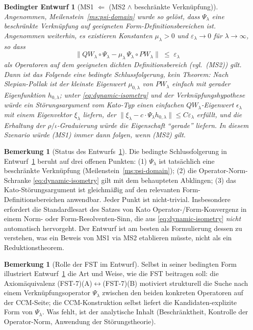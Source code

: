 \documentclass[11pt,a4paper]{article}
\theoremstyle{plain}
\newtheorem{blueprint}[theorem]{Bedingter Entwurf}
\theoremstyle{definition}
\newtheorem{remark}[theorem]{Bemerkung}
\begin{document}
\begin{blueprint}[MS1 $\Leftarrow$ (MS2 $\wedge$ beschränkte Verknüpfung)]
\label{bp:fst-transfer}
Angenommen, Meilenstein~\ref{ms:psi-domain} wurde so gelöst, dass $\Psi_\lambda$
eine beschränkte Verknüpfung auf geeigneten Form-Definitionsbereichen ist.
Angenommen weiterhin, es existieren Konstanten $\mu_\lambda > 0$
und $\varepsilon_\lambda \to 0$ für $\lambda \to \infty$, so dass
\begin{equation}\label{eq:dynamic-isometry}
  \big\| QW_\lambda \circ \Psi_\lambda
    - \mu_\lambda \, \Psi_\lambda \circ PW_\lambda \big\|
  \;\le\; \varepsilon_\lambda
\end{equation}
als Operatoren auf dem geeigneten dichten Definitionsbereich (vgl.~(MS2)) gilt.
Dann ist das Folgende eine bedingte Schlussfolgerung, kein Theorem:
Nach Slepian-Pollak \cite{SlepianPollack1961} ist der kleinste Eigenwert
$\mu_{0,\lambda}$ von $PW_\lambda$ einfach mit gerader Eigenfunktion
$h_{0,\lambda}$; unter \eqref{eq:dynamic-isometry} und der
Verknüpfungshypothese würde ein Störungsargument vom Kato-Typ \cite{Kato}
einen einfachen $QW_\lambda$-Eigenwert $\epsilon_\lambda$ mit einem Eigenvektor
$\xi_\lambda$ liefern, der $\|\xi_\lambda - c \cdot \Psi_\lambda h_{0,\lambda}\| \le
C \varepsilon_\lambda$ erfüllt, und die Erhaltung der $\rho/\iota$-Graduierung würde
die Eigenschaft ``gerade'' liefern. In diesem Szenario würde (MS1) immer dann
folgen, wenn (MS2) gilt.
\end{blueprint}

\begin{remark}[Status des Entwurfs~\ref{bp:fst-transfer}]
\label{rem:blueprint-caveats}
Die bedingte Schlussfolgerung in Entwurf~\ref{bp:fst-transfer} beruht
auf drei offenen Punkten: (1) $\Psi_\lambda$ ist tatsächlich eine beschränkte
Verknüpfung (Meilenstein~\ref{ms:psi-domain}); (2) die Operator-Norm-Schranke
\eqref{eq:dynamic-isometry} gilt mit dem behaupteten Abklingen; (3)
das Kato-Störungsargument ist gleichmäßig auf den relevanten Form-Definitionsbereichen
anwendbar. Jeder Punkt ist nicht-trivial. Insbesondere erfordert die
Standardlesart des Satzes von Kato Operator-/Form-Konvergenz in einem
Norm- oder Form-Resolventen-Sinn, die aus \eqref{eq:dynamic-isometry} \emph{nicht}
automatisch hervorgeht. Der Entwurf ist am besten als Formulierung dessen
zu verstehen, was ein Beweis von MS1 via MS2 etablieren müsste, nicht als
ein Reduktionstheorem.
\end{remark}

\begin{remark}[Rolle der FST im Entwurf]\label{rem:fst-contribution}
Selbst in seiner bedingten Form illustriert Entwurf~\ref{bp:fst-transfer}
die Art und Weise, wie die FST beitragen soll: die Axiomäquivalenz
(FST-7)(A)$\leftrightarrow$(FST-7)(B) motiviert strukturell die Suche nach
einem Verknüpfungsoperator $\Psi_\lambda$ zwischen den beiden konkreten
Operatoren auf der CCM-Seite; die CCM-Konstruktion selbst liefert
die Kandidaten-explizite Form von $\Psi_\lambda$. Was fehlt, ist der
analytische Inhalt (Beschränktheit, Kontrolle der Operator-Norm, Anwendung der
Störungstheorie).
\end{remark}
\end{document}
